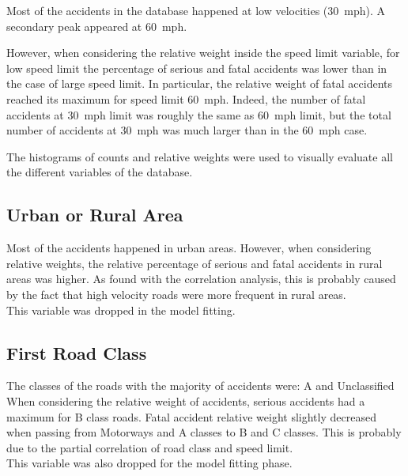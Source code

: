 \documentclass[11pt]{article}
\begin{document}
    \begin{center}
    \end{center}

Most of the accidents in the database happened at low velocities (30~mph). A secondary peak appeared at 60~mph.

However, when considering the relative weight inside the speed limit variable, for low speed limit the percentage of serious and fatal accidents was lower than in the case of large speed limit. In particular, the relative weight of fatal accidents reached its maximum for speed limit 60~mph. Indeed, the number of fatal accidents at 30~mph limit was roughly the same as 60~mph limit, but the total number of accidents at 30~mph was much larger than in the 60~mph case.

The histograms of counts and relative weights were used to visually evaluate all the different variables of the database.

    \hypertarget{urban-or-rural-area}{%
\subsection{Urban or Rural Area}\label{urban-or-rural-area}}

    \begin{center}
    \end{center}

Most of the accidents happened in urban areas. However, when considering relative weights, the relative percentage of serious and fatal accidents in rural areas was higher. As found with the correlation analysis, this is probably caused by the fact that high velocity roads were more frequent in rural areas.\\
This variable was dropped in the model fitting.

    \hypertarget{first-road-class}{%
\subsection{First Road Class}\label{first-road-class}}

    \begin{center}
    \end{center}

The classes of the roads with the majority of accidents were: A and Unclassified\\
When considering the relative weight of accidents, serious accidents had a maximum for B class roads. Fatal accident relative weight slightly decreased when passing from Motorways and A classes to B and C classes. This is probably due to the partial correlation of road class and speed limit.\\
This variable was also dropped for the model fitting phase.
\end{document}
